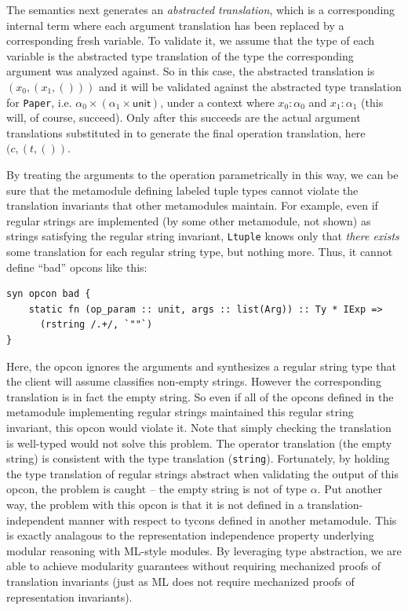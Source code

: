 The semantics next generates an \emph{abstracted translation}, which is a corresponding internal term where each argument translation has been replaced by a corresponding fresh variable. To validate it, we assume that the type of each variable is the abstracted type translation of the type the corresponding argument was analyzed against. So in this case, the abstracted translation is $(x_0, (x_1, ()))$ and it will be validated against the abstracted type translation for \lstinline{Paper}, i.e. $\alpha_0 \times (\alpha_1 \times \mathsf{unit})$, under a context where $x_0 : \alpha_0$ and  $x_1 : \alpha_1$ (this will, of course, succeed). Only after this succeeds are the actual argument translations substituted in to generate the final operation translation, here $({c}, ({t}, ())$.

By treating the arguments to the operation parametrically in this way, we can be sure that the metamodule defining labeled tuple types cannot violate the translation invariants that other metamodules maintain. For example, even if regular strings are implemented (by some other metamodule, not shown) as strings satisfying the regular string invariant, \lstinline{Ltuple} knows only that \emph{there exists} some translation for each regular string type, but nothing more. Thus, it cannot define ``bad'' opcons like this:

\begin{lstlisting}[numbers=none]
syn opcon bad {
	static fn (op_param :: unit, args :: list(Arg)) :: Ty * IExp => 
	  (rstring /.+/, `""`)
}
\end{lstlisting}
Here, the opcon ignores the arguments and synthesizes a regular string type that the client will assume classifies non-empty strings. However the corresponding translation is in fact the empty string. So even if all of the opcons defined in the metamodule implementing regular strings maintained this regular string invariant, this opcon would violate it. Note  that simply checking the translation is  well-typed would not solve this problem. The operator translation (the empty string) is consistent with the type translation (\lstinline{string}). Fortunately, by holding the type translation of regular strings abstract when validating the output of this opcon, the problem is caught -- the empty string is not of type $\alpha$. Put another way, the problem with this opcon is that it is not defined in a translation-independent manner with respect to tycons defined in another metamodule. This is exactly analagous to the representation independence property underlying modular reasoning with ML-style modules. By leveraging type abstraction, we are able to achieve modularity guarantees without requiring mechanized proofs of translation invariants (just as ML does not require mechanized proofs of representation invariants). 

